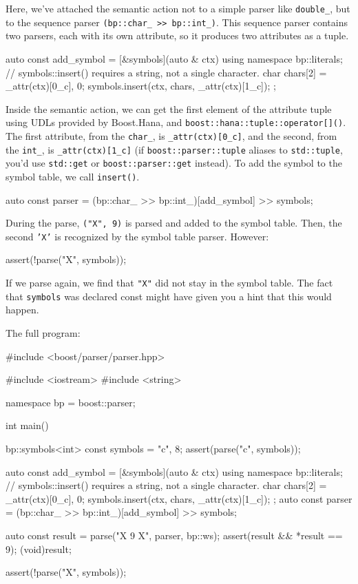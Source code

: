 Here, we've attached the semantic action not to a simple parser like \texttt{double\_}, but to the sequence parser \texttt{(bp::char\_ >> bp::int\_)}. This sequence parser contains two parsers, each with its own attribute, so it produces two attributes as a tuple.

\begin{code}
auto const add_symbol = [&symbols](auto & ctx) {
    using namespace bp::literals;
    // symbols::insert() requires a string, not a single character.
    char chars[2] = {_attr(ctx)[0_c], 0};
    symbols.insert(ctx, chars, _attr(ctx)[1_c]);
};
\end{code}

Inside the semantic action, we can get the first element of the attribute tuple using UDLs provided by Boost.Hana, and \texttt{boost::hana::tuple::operator{[}{]}()}. The first attribute, from the \texttt{char\_}, is \texttt{\_attr(ctx){[}0\_c{]}}, and the second, from the \texttt{int\_}, is \texttt{\_attr(ctx){[}1\_c{]}} (if \texttt{boost::parser::tuple} aliases to \texttt{std::tuple}, you'd use \texttt{std::get} or \texttt{boost::parser::get} instead). To add the symbol to the symbol table, we call \texttt{insert()}.

\begin{code}
auto const parser = (bp::char_ >> bp::int_)[add_symbol] >> symbols;
\end{code}

During the parse, \texttt{("X", 9)} is parsed and added to the symbol table. Then, the second \texttt{'X'} is recognized by the symbol table parser. However:

\begin{code}
assert(!parse("X", symbols));
\end{code}

If we parse again, we find that \texttt{"X"} did not stay in the symbol table. The fact that \texttt{symbols} was declared const might have given you a hint that this would happen.

The full program:

\begin{code}
#include <boost/parser/parser.hpp>

#include <iostream>
#include <string>


namespace bp = boost::parser;

int main()
{
    bp::symbols<int> const symbols = {{"c", 8}};
    assert(parse("c", symbols));

    auto const add_symbol = [&symbols](auto & ctx) {
        using namespace bp::literals;
        // symbols::insert() requires a string, not a single character.
        char chars[2] = {_attr(ctx)[0_c], 0};
        symbols.insert(ctx, chars, _attr(ctx)[1_c]);
    };
    auto const parser = (bp::char_ >> bp::int_)[add_symbol] >> symbols;

    auto const result = parse("X 9 X", parser, bp::ws);
    assert(result && *result == 9);
    (void)result;

    assert(!parse("X", symbols));
}
\end{code}

